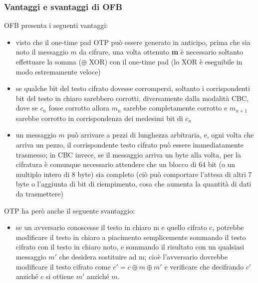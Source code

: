 \subsubsection{Vantaggi e svantaggi di OFB}
OFB presenta i seguenti vantaggi:
\begin{itemize}
\item visto che il one-time pad OTP può essere generato in anticipo, prima che sia noto il messaggio $m$ da cifrare, una volta ottenuto \textbf{m} è necessario soltanto effettuare la somma ($\oplus$ XOR) con il one-time pad (lo XOR è eseguibile in modo estremamente veloce)
\item se qualche bit del testo cifrato dovesse corrompersi, soltanto i corrispondenti bit del testo in chiaro sarebbero corrotti, diversamente dalla modalità CBC, dove se $c_{n}$ fosse corrotto allora $m_{n}$ sarebbe completamente corrotto e $m_{n+1}$ sarebbe corrotto in corrispondenza dei medesimi bit di $c_{n}$
\item un messaggio $m$ può arrivare a pezzi di lunghezza arbitraria, e, ogni volta che arriva un pezzo, il corrispondente testo cifrato può essere immediatamente trasmesso; in CBC invece, se il messaggio arriva un byte alla volta, per la cifratura è comunque necessario attendere che un blocco di 64 bit (o un multiplo intero di 8 byte) sia completo (ciò può comportare l'attesa di altri 7 byte o l'aggiunta di bit di riempimento, cosa che aumenta la quantità di dati da trasmettere)
\end{itemize}
OTP ha però anche il seguente svantaggio:
\begin{itemize}
\item se un avversario conoscesse il testo in chiaro m e quello cifrato c, potrebbe modificare il testo in
chiaro a piacimento semplicemente sommando il testo cifrato con il testo in chiaro noto, e sommando il risultato con un qualsiasi messaggio $m'$ che desidera sostituire ad m; cioè l'avversario dovrebbe modificare il testo cifrato come $c' = c \oplus m \oplus m'$ e verificare che decifrando $c'$ anziché $c$ si ottiene $m'$ anziché $m$.
\end{itemize}
